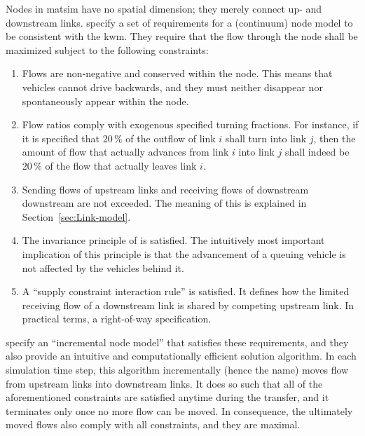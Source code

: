 Nodes in \gls{matsim} have no spatial dimension; they merely connect up-
and downstream links. \citet{tampere-2010b} specify a set of requirements
for a (continuum) node model to be consistent with the \gls{kwm}. They require
that the flow through the node shall be maximized subject to the following
constraints:
\begin{enumerate}
\item Flows are non-negative and conserved within the node. This means that
vehicles cannot drive backwards, and they must neither disappear nor
spontaneously appear within the node.
\item Flow ratios comply with exogenous specified turning fractions. For
instance, if it is specified that 20\,\% of the outflow of link
$i$ shall turn into link $j$, then the amount of flow that actually
advances from link $i$ into link $j$ shall indeed be 20\,\%
of the flow that actually leaves link $i$.
\item Sending flows of upstream links and receiving flows of downstream
downstream are not exceeded. The meaning of this is explained in Section~\ref{sec:Link-model}.
\item The invariance principle of \citet{lebacque-2005} is satisfied. The
intuitively most important implication of this principle is that the
advancement of a queuing vehicle is not affected by the vehicles
behind it.
\item A {}``supply constraint interaction rule'' is satisfied. It defines
how the limited receiving flow of a downstream link is shared
by competing upstream link. In practical terms, a right-of-way specification.
\end{enumerate}
\citet{floetteroed-2011a} specify an {}``incremental node model''
that satisfies these requirements, and they also provide an intuitive
and computationally efficient solution algorithm. In each simulation
time step, this algorithm incrementally (hence the name) moves flow
from upstream links into downstream links. It does so such that all
of the aforementioned constraints are satisfied anytime during the
transfer, and it terminates only once no more flow can be moved. In
consequence, the ultimately moved flows also comply with all constraints,
and they are maximal. 

